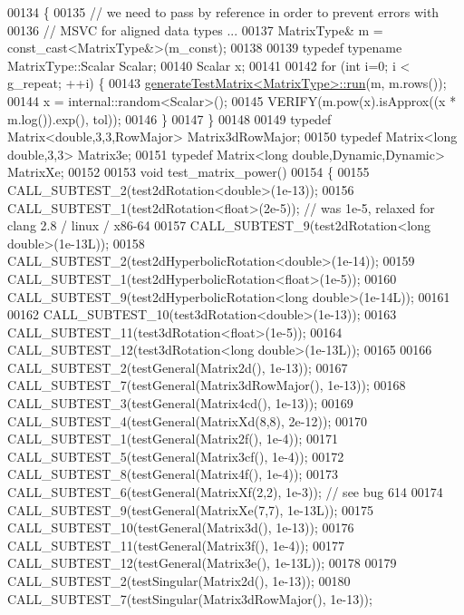 \begin{DoxyCode}
00134 \{
00135   \textcolor{comment}{// we need to pass by reference in order to prevent errors with}
00136   \textcolor{comment}{// MSVC for aligned data types ...}
00137   MatrixType& m = \textcolor{keyword}{const\_cast<}MatrixType&\textcolor{keyword}{>}(m\_const);
00138 
00139   \textcolor{keyword}{typedef} \textcolor{keyword}{typename} MatrixType::Scalar Scalar;
00140   Scalar x;
00141 
00142   \textcolor{keywordflow}{for} (\textcolor{keywordtype}{int} i=0; i < g\_repeat; ++i) \{
00143     \hyperlink{structgenerate_test_matrix}{generateTestMatrix<MatrixType>::run}(m, m.rows());
00144     x = internal::random<Scalar>();
00145     VERIFY(m.pow(x).isApprox((x * m.log()).exp(), tol));
00146   \}
00147 \}
00148 
00149 \textcolor{keyword}{typedef} Matrix<double,3,3,RowMajor>         Matrix3dRowMajor;
00150 \textcolor{keyword}{typedef} Matrix<long double,3,3>             Matrix3e;
00151 \textcolor{keyword}{typedef} Matrix<long double,Dynamic,Dynamic> MatrixXe;
00152  
00153 \textcolor{keywordtype}{void} test\_matrix\_power()
00154 \{
00155   CALL\_SUBTEST\_2(test2dRotation<double>(1e-13));
00156   CALL\_SUBTEST\_1(test2dRotation<float>(2e-5));  \textcolor{comment}{// was 1e-5, relaxed for clang 2.8 / linux / x86-64}
00157   CALL\_SUBTEST\_9(test2dRotation<long double>(1e-13L));
00158   CALL\_SUBTEST\_2(test2dHyperbolicRotation<double>(1e-14));
00159   CALL\_SUBTEST\_1(test2dHyperbolicRotation<float>(1e-5));
00160   CALL\_SUBTEST\_9(test2dHyperbolicRotation<long double>(1e-14L));
00161 
00162   CALL\_SUBTEST\_10(test3dRotation<double>(1e-13));
00163   CALL\_SUBTEST\_11(test3dRotation<float>(1e-5));
00164   CALL\_SUBTEST\_12(test3dRotation<long double>(1e-13L));
00165 
00166   CALL\_SUBTEST\_2(testGeneral(Matrix2d(),         1e-13));
00167   CALL\_SUBTEST\_7(testGeneral(Matrix3dRowMajor(), 1e-13));
00168   CALL\_SUBTEST\_3(testGeneral(Matrix4cd(),        1e-13));
00169   CALL\_SUBTEST\_4(testGeneral(MatrixXd(8,8),      2e-12));
00170   CALL\_SUBTEST\_1(testGeneral(Matrix2f(),         1e-4));
00171   CALL\_SUBTEST\_5(testGeneral(Matrix3cf(),        1e-4));
00172   CALL\_SUBTEST\_8(testGeneral(Matrix4f(),         1e-4));
00173   CALL\_SUBTEST\_6(testGeneral(MatrixXf(2,2),      1e-3)); \textcolor{comment}{// see bug 614}
00174   CALL\_SUBTEST\_9(testGeneral(MatrixXe(7,7),      1e-13L));
00175   CALL\_SUBTEST\_10(testGeneral(Matrix3d(),        1e-13));
00176   CALL\_SUBTEST\_11(testGeneral(Matrix3f(),        1e-4));
00177   CALL\_SUBTEST\_12(testGeneral(Matrix3e(),        1e-13L));
00178 
00179   CALL\_SUBTEST\_2(testSingular(Matrix2d(),         1e-13));
00180   CALL\_SUBTEST\_7(testSingular(Matrix3dRowMajor(), 1e-13));

\end{DoxyCode}
